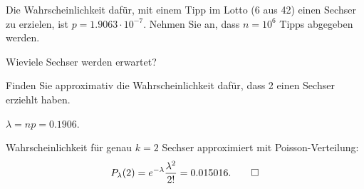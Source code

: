 Die Wahrscheinlichkeit dafür, mit einem Tipp im Lotto (6 aus 42) einen
Sechser zu erzielen, ist $p=1.9063\cdot10^{-7}$.
Nehmen Sie an, dass $n=10^6$ Tipps abgegeben werden.
\begin{teilaufgaben}
\item
Wieviele Sechser werden erwartet?
\item
Finden Sie approximativ die Wahrscheinlichkeit dafür, dass 
2 einen Sechser erziehlt haben.
\end{teilaufgaben}

\begin{loesung}
\begin{teilaufgaben}
\item
$\lambda = np = 0.1906$.
\item
Wahrscheinlichkeit für
genau $k=2$ Sechser approximiert mit Poisson-Verteilung:
\[
P_\lambda(2)
= 
e^{-\lambda}\frac{\lambda^2}{2!}
=
0.015016.
\qedhere
\]
\end{teilaufgaben}
\end{loesung}

